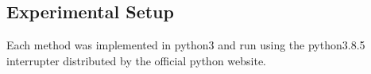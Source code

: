 \subsection{Experimental Setup}\label{Section5.2}

Each method was implemented in python3 and run using the python3.8.5 interrupter distributed by the official python website.